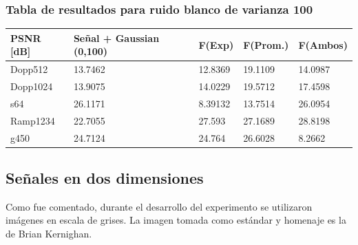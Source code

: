 \subsubsection{Tabla de resultados para ruido blanco de varianza 100}

\begin{table}[H]
        \begin{tabular}{|l|llll|}
                \hline
                \textbf{PSNR [dB]} & Se\~nal + Gaussian (0,100) & F(Exp) & F(Prom.) & F(Ambos) \\ \hline
                    Dopp512 & 13.7462 & 12.8369 & 19.1109 & 14.0987 \\
                    Dopp1024 & 13.9075 & 14.0229 & 19.5712 & 17.4598 \\
                    s64 & 26.1171 & 8.39132 & 13.7514 & 26.0954 \\
                    Ramp1234 & 22.7055 & 27.593 & 27.1689 & 28.8198 \\
                    g450 & 24.7124 & 24.764 & 26.6028 & 8.2662 \\ \hline
                    \end{tabular}
                \end{table}


\newpage

        \subsection{Se\~nales en dos dimensiones}

Como fue comentado, durante el desarrollo del experimento se utilizaron
im\'agenes en escala de grises. La imagen tomada como est\'andar y homenaje es 
la de Brian Kernighan.

